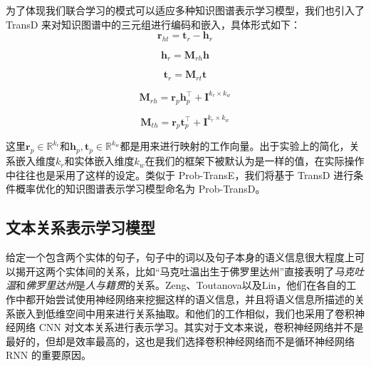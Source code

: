 为了体现我们联合学习的模式可以适应多种知识图谱表示学习模型，我们也引入了 TransD 来对知识图谱中的三元组进行编码和嵌入，具体形式如下：
\begin{equation}
\textbf{r}_{ht} = \textbf{t}_{r} - \textbf{h}_{r}
\end{equation}

\begin{equation}
\textbf{h}_{r} = \textbf{M}_{rh}\textbf{h}
\end{equation}

\begin{equation}
\textbf{t}_{r} = \textbf{M}_{rt}\textbf{t}
\end{equation}

\begin{equation}
\textbf{M}_{rh} = \textbf{r}_p\textbf{h}_p^{\top}+\textbf{I}^{k_r \times k_w}
\end{equation}

\begin{equation}
\textbf{M}_{th} = \textbf{r}_p\textbf{t}_p^{\top}+\textbf{I}^{k_r \times k_w}
\end{equation}

这里$\textbf{r}_p \in \mathbb{R}^{k_r} $和$\textbf{h}_p, \textbf{t}_p \in \mathbb{R}^{k_w}$都是用来进行映射的工作向量。出于实验上的简化，关系嵌入维度$k_r$和实体嵌入维度$k_w$在我们的框架下被默认为是一样的值，在实际操作中往往也是采用了这样的设定。类似于 Prob-TransE，我们将基于 TransD 进行条件概率优化的知识图谱表示学习模型命名为 Prob-TransD。

\subsection{文本关系表示学习模型}
\label{sec3:relation}

给定一个包含两个实体的句子，句子中的词以及句子本身的语义信息很大程度上可以揭开这两个实体间的关系，比如``马克吐温出生于佛罗里达州''直接表明了\emph{马克吐温}和\emph{佛罗里达州}是\emph{人与籍贯}的关系。Zeng、Toutanova以及Lin\cite{zeng2014relation,toutanova2015representing,lin2016neural}，他们在各自的工作中都开始尝试使用神经网络来挖掘这样的语义信息，并且将语义信息所描述的关系嵌入到低维空间中用来进行关系抽取。和他们的工作\cite{zeng2014relation,toutanova2015representing,lin2016neural}相似，我们也采用了卷积神经网络 CNN 对文本关系进行表示学习。其实对于文本来说，卷积神经网络并不是最好的，但却是效率最高的，这也是我们选择卷积神经网络而不是循环神经网络 RNN 的重要原因。


